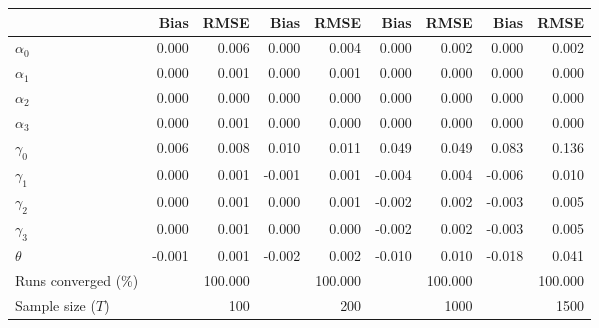 
\begin{tabular}[t]{lrrrrrrrr}
\toprule
  & Bias & RMSE & Bias & RMSE & Bias & RMSE & Bias & RMSE\\
\midrule
$\alpha_{0}$ & 0.000 & 0.006 & 0.000 & 0.004 & 0.000 & 0.002 & 0.000 & 0.002\\
$\alpha_{1}$ & 0.000 & 0.001 & 0.000 & 0.001 & 0.000 & 0.000 & 0.000 & 0.000\\
$\alpha_{2}$ & 0.000 & 0.000 & 0.000 & 0.000 & 0.000 & 0.000 & 0.000 & 0.000\\
$\alpha_{3}$ & 0.000 & 0.001 & 0.000 & 0.000 & 0.000 & 0.000 & 0.000 & 0.000\\
$\gamma_{0}$ & 0.006 & 0.008 & 0.010 & 0.011 & 0.049 & 0.049 & 0.083 & 0.136\\
$\gamma_{1}$ & 0.000 & 0.001 & -0.001 & 0.001 & -0.004 & 0.004 & -0.006 & 0.010\\
$\gamma_{2}$ & 0.000 & 0.001 & 0.000 & 0.001 & -0.002 & 0.002 & -0.003 & 0.005\\
$\gamma_{3}$ & 0.000 & 0.001 & 0.000 & 0.000 & -0.002 & 0.002 & -0.003 & 0.005\\
$\theta$ & -0.001 & 0.001 & -0.002 & 0.002 & -0.010 & 0.010 & -0.018 & 0.041\\
Runs converged (\%) &  & 100.000 &  & 100.000 &  & 100.000 &  & 100.000\\
Sample size ($T$) &  & 100 &  & 200 &  & 1000 &  & 1500\\
\bottomrule
\end{tabular}
